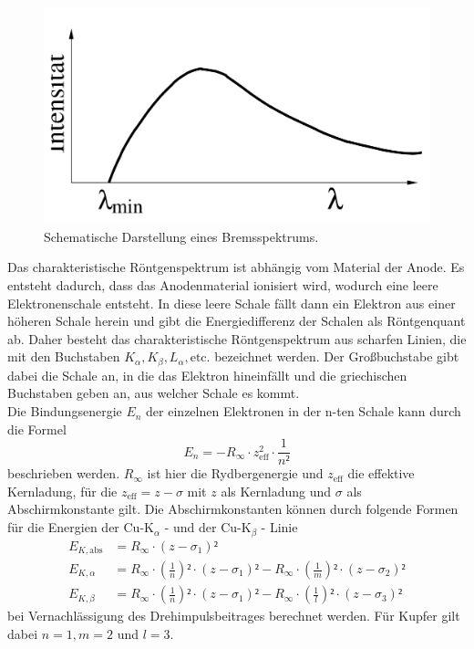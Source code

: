\begin{figure}[H]
    \centering
    \includegraphics[width=\textwidth/2]{content/Bilder/Bremsspektrum.jpeg}
    \caption{Schematische Darstellung eines Bremsspektrums.}
    \label{fig:Bremsspektrum}
\end{figure}

Das charakteristische Röntgenspektrum ist abhängig vom Material der Anode. Es entsteht dadurch, dass das Anodenmaterial ionisiert wird, wodurch eine leere 
Elektronenschale entsteht. In diese leere Schale fällt dann ein Elektron aus einer höheren Schale herein und gibt die Energiedifferenz der Schalen als Röntgenquant 
ab. Daher besteht das charakteristische Röntgenspektrum aus scharfen Linien, die mit den Buchstaben $K_\alpha, K_\beta, L_\alpha, \text{etc.}$ bezeichnet werden. Der
Großbuchstabe gibt dabei die Schale an, in die das Elektron hineinfällt und die griechischen Buchstaben geben an, aus welcher Schale es kommt. \\
Die Bindungsenergie $E_n$ der einzelnen Elektronen in der n-ten Schale kann durch die Formel 
\begin{equation}
E_n = - R_{\infty} \cdot z^{2}_{\text{eff}} \cdot \frac{1}{n²}
\label{Bindungsenergie_Elektronen}
\end{equation}
beschrieben werden. $R_{\infty}$ ist hier die Rydbergenergie und $z_{\text{eff}}$ die effektive Kernladung, für die $z_{\text{eff}} = z - \sigma$ mit $z$ als Kernladung 
und $\sigma$ als Abschirmkonstante gilt. 
Die Abschirmkonstanten können durch folgende Formen für die Energien der $\text{Cu-K}_\alpha$ - und der $\text{Cu-K}_{\beta}$ - Linie 
\begin{align}
    E_{K,\text{abs}} &= R_{\infty} \cdot \left(z - \sigma_1\right)² \label{eqn:Kupfer_Linien_Energien_abs} \\
    E_{K,\alpha} &= R_{\infty} \cdot \left(\frac{1}{n}\right)² \cdot \left(z - \sigma_1\right)² - R_{\infty} \cdot \left(\frac{1}{m}\right)² \cdot \left(z - \sigma_2\right)² \label{eqn:Kupfer_Linien_Energien_alpha}\\
    E_{K,\beta} &= R_{\infty} \cdot \left(\frac{1}{n}\right)² \cdot \left(z - \sigma_1\right)² - R_{\infty} \cdot \left(\frac{1}{l}\right)² \cdot \left(z - \sigma_3\right)² \label{eqn:Kupfer_Linien_Energien_beta}
 \end{align}
bei Vernachlässigung des Drehimpulsbeitrages berechnet werden. Für Kupfer gilt dabei $n = 1, m = 2$ und $l = 3$. \\


